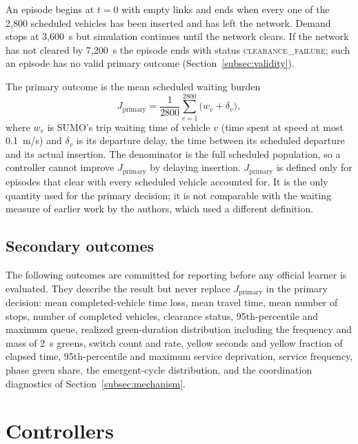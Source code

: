 \documentclass[review,12pt]{elsarticle}
\newcommand{\Jp}{J_{\mathrm{primary}}}
\begin{document}
An episode begins at $t=0$ with empty links and ends when every one of
the 2{,}800 scheduled vehicles has been inserted and has left the
network. Demand stops at 3{,}600~s but simulation continues until the
network clears. If the network has not cleared by 7{,}200~s the episode
ends with status \textsc{clearance\_failure}; such an episode has no
valid primary outcome (Section~\ref{subsec:validity}).

The primary outcome is the mean scheduled waiting burden
\begin{equation}
\Jp=\frac{1}{2800}\sum_{v=1}^{2800}\bigl(w_v+\delta_v\bigr),
\label{eq:jprimary}
\end{equation}
where $w_v$ is SUMO's trip waiting time of vehicle $v$ (time spent at
speed at most 0.1~m/s) and $\delta_v$ is its departure delay, the time
between its scheduled departure and its actual insertion.
The denominator is the full scheduled population, so a controller cannot
improve $\Jp$ by delaying insertion. $\Jp$ is defined only for episodes
that clear with every scheduled vehicle accounted for. It is the only
quantity used for the primary decision; it is not comparable with the
waiting measure of earlier work by the authors, which used a different
definition.

\subsection{Secondary outcomes}
\label{subsec:secondary}

The following outcomes are committed for reporting before any official
learner is evaluated. They describe the result but never replace $\Jp$
in the primary decision:
mean completed-vehicle time loss, mean travel time, mean number of
stops, number of completed vehicles, clearance status, 95th-percentile
and maximum queue, realized green-duration distribution including the
frequency and mass of 2~s greens, switch count and rate, yellow seconds
and yellow fraction of elapsed time, 95th-percentile and maximum service
deprivation, service frequency, phase green share, the emergent-cycle
distribution, and the coordination diagnostics of
Section~\ref{subsec:mechanism}.

\section{Controllers}
\label{sec:controllers}
\end{document}
